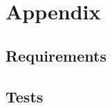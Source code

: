 \documentclass[11pt]{report}
\begin{document}


{}%


\appendix

\chapter{Appendix}

 

\section{Requirements}

\section{Tests}

 

 
\end{document}

